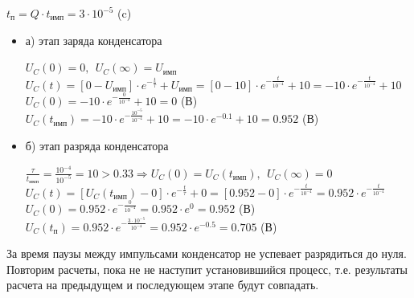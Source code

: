 		$t_\text{п} = Q \cdot t_\text{имп} = 3 \cdot 10^{-5}$ (c)
		
		
\begin{itemize}
\item[] а) этап заряда конденсатора

		$U_C(0) = 0,\ \ U_C(\infty) = U_\text{имп}$\\	
		$U_C(t) = [0 - U_\text{имп}] \cdot e^{-\frac{t}{\tau}} + U_\text{имп} = [0 - 10] \cdot e^{-\frac{t}{10^{-4}}} + 10 = -10 \cdot e^{-\frac{t}{10^{-4}}} + 10$\\
		$U_C(0) = -10 \cdot e^{-\frac{0}{10^{-4}}} + 10 = 0$ (В)\\
		$U_C(t_\text{имп}) = -10 \cdot e^{-\frac{10^{-5}}{10^{-4}}} + 10 = -10 \cdot e^{-0.1} + 10 = 0.952$ (В)\\
		
\item[] б) этап разряда конденсатора
	
		$\frac{\tau}{t_\text{имп}} = \frac{10^{-4}}{10^{-5}} = 10 > 0.33 \Rightarrow U_C(0) = U_C(t_\text{имп}),\ \ U_C(\infty) = 0$\\
		$U_C(t) = [U_C(t_\text{имп}) - 0] \cdot e^{-\frac{t}{\tau}} + 0 =  [0.952 - 0] \cdot e^{-\frac{t}{10^{-4}}} = 0.952 \cdot e^{-\frac{t}{10^{-4}}}$\\
		$U_C(0) = 0.952 \cdot e^{-\frac{0}{10^{-4}}} = 0.952 \cdot e^0 = 0.952$ (В)\\
		$U_C(t_\text{п}) = 0.952 \cdot e^{-\frac{3 \cdot 10^{-5}}{10^{-4}}} = 0.952 \cdot e^{-0.5} = 0.705$ (В)\\
		
\end{itemize}				
		
За время паузы между импульсами конденсатор не успевает разрядиться до нуля. Повторим расчеты, пока не не наступит установившийся процесс, т.е. результаты расчета на предыдущем и последующем этапе будут совпадать.	
	
